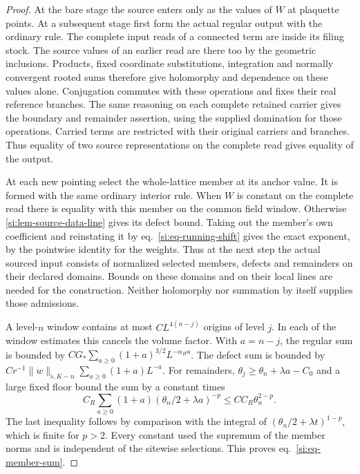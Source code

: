 \documentclass[11pt,letterpaper,reqno]{amsart}
\numberwithin{equation}{section}
\renewcommand{\eqref}[1]{\textup{eq.~\ref{#1}}}
\theoremstyle{definition}
\theoremstyle{remark}
\begin{document}
\begin{proof}
At the bare stage the source enters only as the values of $W$ at
plaquette points. At a subsequent stage first form the actual
regular output with the ordinary rule. The complete input
reads of a connected term are inside its filing stock. The
source values of an earlier read are there too by the geometric
inclusions. Products, fixed coordinate substitutions, integration
and normally convergent rooted sums therefore give holomorphy
and dependence on these values alone. Conjugation commutes with
these operations and fixes their real reference branches. The
same reasoning on each complete retained carrier gives the
boundary and remainder assertion, using the supplied domination
for those operations. Carried terms are restricted with their
original carriers and branches. Thus equality of two source
representations on the complete read gives equality of the output.

At each new pointing select the whole-lattice member at its
anchor value. It is formed with the same ordinary interior rule.
When $W$ is constant on the complete read there is equality
with this member on the common field window. Otherwise
\cref{si:lem-source-data-line} gives its defect bound. Taking out
the member's own coefficient and reinstating it by
\eqref{si:eq-running-shift} gives the exact exponent, by the
pointwise identity for the weights. Thus at the next step the
actual sourced input consists of normalized selected members,
defects and remainders on their declared domains. Bounds on
these domains and on their local lines are needed for the
construction. Neither holomorphy nor summation by itself supplies
those admissions.

A level-$n$ window contains at most $C L^{4(n-j)}$ origins of
level $j$. In each of the window estimates this cancels the
volume factor. With $a=n-j$, the regular sum is bounded by
$C G_*\sum_{a\ge0}(1+a)^{3/2}L^{-\alpha_H a}$. The defect sum
is bounded by
$C r^{-1}\|w\|_{\flat,K-n}\sum_{a\ge0}(1+a)L^{-a}$.
For remainders, $\theta_j\ge\theta_n+\lambda a-C_0$ and a
large fixed floor bound the sum by a constant times
\[
 C_R\sum_{a\ge0}(1+a)(\theta_n/2+\lambda a)^{-p}
 \le C C_R\theta_n^{2-p}.
\]
The last inequality follows by comparison with the integral
of $(\theta_n/2+\lambda t)^{1-p}$, which is finite for $p>2$.
Every constant used the supremum of the member norms and is
independent of the sitewise selections. This proves
\eqref{si:eq-member-sum}.
\end{proof}
\end{document}
